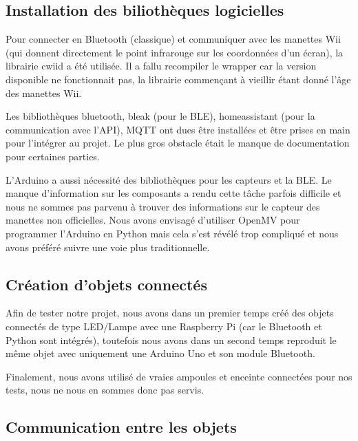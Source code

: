 \documentclass{article}
\begin{document}
        \subsection{Installation des biliothèques logicielles}

            Pour connecter en Bluetooth (classique) et communiquer avec les manettes Wii (qui donnent directement le point infrarouge sur les coordonnées d'un écran),
                la librairie cwiid a été utilisée. Il a fallu recompiler le wrapper car la version disponible ne fonctionnait pas, la librairie commençant à vieillir
                étant donné l'âge des manettes Wii.           

            Les bibliothèques bluetooth, bleak (pour le BLE), homeassistant (pour la communication avec l'API), MQTT ont dues être installées et être prises en main pour l'intégrer 
                au projet. Le plus gros obstacle était le manque de documentation pour certaines parties.

            L'Arduino a aussi nécessité des bibliothèques pour les capteurs et la BLE.
                Le manque d'information sur les composants a rendu cette tâche parfois difficile et nous ne sommes pas 
                parvenu à trouver des informations sur le capteur des manettes non officielles.
            Nous avons envisagé d'utiliser OpenMV pour programmer l'Arduino en Python mais cela s'est révélé trop compliqué
                et nous avons préféré suivre une voie plus traditionnelle.
            
        \subsection{Création d'objets connectés}

            Afin de tester notre projet, nous avons dans un premier temps créé des objets connectés de type LED/Lampe
                avec une Raspberry Pi (car le Bluetooth et Python sont intégrés), toutefois nous avons dans un second temps
                reproduit le même objet avec uniquement une Arduino Uno et son module Bluetooth.
            
            Finalement, nous avons utilisé de vraies ampoules et enceinte connectées pour nos tests, nous ne nous en sommes donc pas servis.

        \subsection{Communication entre les objets}
\end{document}
